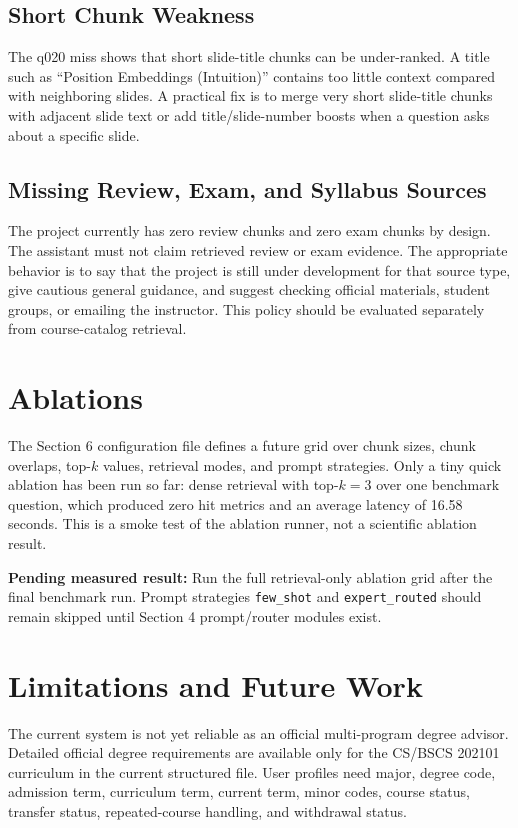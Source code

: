 \documentclass[11pt]{article}
\newcommand{\todoresult}[1]{%
  \par\noindent\colorbox{orange!14}{%
    \parbox{0.965\linewidth}{\textbf{\textcolor{todocolor}{Pending measured result:}} #1}}%
  \par\vspace{0.55em}}
\begin{document}
\subsection{Short Chunk Weakness}
The q020 miss shows that short slide-title chunks can be under-ranked. A title such as ``Position Embeddings (Intuition)'' contains too little context compared with neighboring slides. A practical fix is to merge very short slide-title chunks with adjacent slide text or add title/slide-number boosts when a question asks about a specific slide.

\subsection{Missing Review, Exam, and Syllabus Sources}
The project currently has zero review chunks and zero exam chunks by design. The assistant must not claim retrieved review or exam evidence. The appropriate behavior is to say that the project is still under development for that source type, give cautious general guidance, and suggest checking official materials, student groups, or emailing the instructor. This policy should be evaluated separately from course-catalog retrieval.

\section{Ablations}
The Section 6 configuration file defines a future grid over chunk sizes, chunk overlaps, top-$k$ values, retrieval modes, and prompt strategies. Only a tiny quick ablation has been run so far: dense retrieval with top-$k=3$ over one benchmark question, which produced zero hit metrics and an average latency of 16.58 seconds. This is a smoke test of the ablation runner, not a scientific ablation result.

\todoresult{Run the full retrieval-only ablation grid after the final benchmark run. Prompt strategies \texttt{few\_shot} and \texttt{expert\_routed} should remain skipped until Section 4 prompt/router modules exist.}

\section{Limitations and Future Work}
The current system is not yet reliable as an official multi-program degree advisor. Detailed official degree requirements are available only for the CS/BSCS 202101 curriculum in the current structured file. User profiles need major, degree code, admission term, curriculum term, current term, minor codes, course status, transfer status, repeated-course handling, and withdrawal status.
\end{document}
